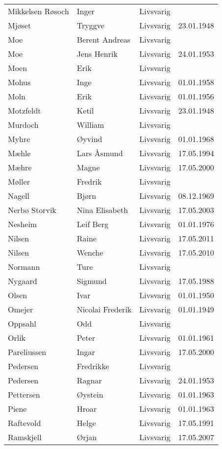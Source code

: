 \documentclass[fsbok.tex]{subfiles}
\begin{document}
\begin{longtable}{llll}
Mikkelsen Røsoch	&	Inger	&	Livsvarig 	&		\\
Mjøset	&	Tryggve	&	Livsvarig 	&	23.01.1948	\\
Moe	&	Berent Andreas	&	Livsvarig 	&		\\
Moe	&	Jens Henrik	&	Livsvarig 	&	24.01.1953	\\
Moen	&	Erik	&	Livsvarig 	&		\\
Mohus	&	Inge	&	Livsvarig 	&	01.01.1958	\\
Moln	&	Erik	&	Livsvarig 	&	01.01.1956	\\
Motzfeldt	&	Ketil	&	Livsvarig 	&	23.01.1948	\\
Murdoch	&	William	&	Livsvarig 	&		\\
Myhre	&	Øyvind	&	Livsvarig 	&	01.01.1968	\\
Mæhle	&	Lars Åsmund	&	Livsvarig 	&	17.05.1994	\\
Mæhre	&	Magne	&	Livsvarig	&	17.05.2000	\\
Møller	&	Fredrik	&	Livsvarig 	&		\\
Nagell	&	Bjørn	&	Livsvarig 	&	08.12.1969	\\
Nerbø Storvik 	&	Nina Elisabeth	&	Livsvarig	&	17.05.2003	\\
Nesheim	&	Leif Berg	&	Livsvarig 	&	01.01.1976	\\
Nilsen	&	Raine	&	Livsvarig	&	17.05.2011	\\
Nilsen	&	Wenche	&	Livsvarig	&	17.05.2010	\\
Normann	&	Ture	&	Livsvarig 	&		\\
Nygaard	&	Sigmund	&	Livsvarig 	&	17.05.1988	\\
Olsen	&	Ivar	&	Livsvarig 	&	01.01.1950	\\
Omejer	&	Nicolai Frederik	&	Livsvarig 	&	01.01.1949	\\
Oppsahl	&	Odd	&	Livsvarig 	&		\\
Orlik	&	Peter	&	Livsvarig 	&	01.01.1961	\\
Pareliussen	&	Ingar	&	Livsvarig	&	17.05.2000	\\
Pedersen	&	Fredrikke	&	Livsvarig 	&		\\
Pedersen	&	Ragnar	&	Livsvarig 	&	24.01.1953	\\
Pettersen	&	Øystein	&	Livsvarig 	&	01.01.1963	\\
Piene	&	Hroar	&	Livsvarig 	&	01.01.1963	\\
Raftevold	&	Helge	&	Livsvarig 	&	17.05.1991	\\
Ramskjell	&	Ørjan	&	Livsvarig	&	17.05.2007	\\

\end{longtable}
\end{document}
